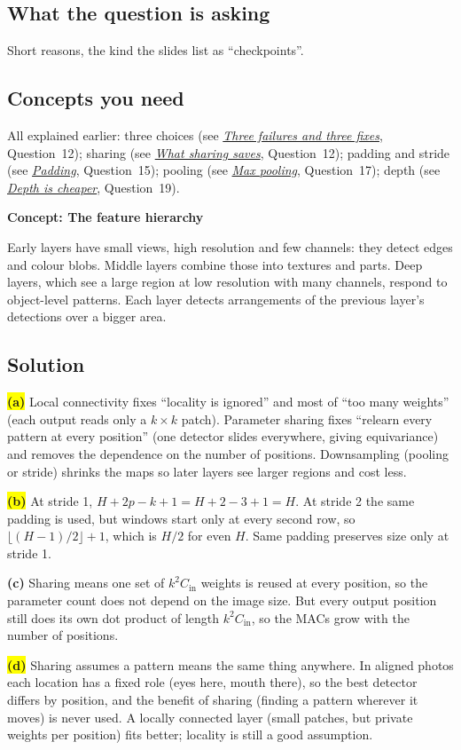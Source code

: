 \documentclass[12pt,a4paper]{article}
\newcommand{\concept}[2]{\par\medskip\phantomsection\label{#1}{\large\bfseries\color{blue!50!black} Concept: #2}\par}
\newcommand{\seeconcept}[3]{(see \hyperref[#1]{\textit{#2}}, Question~#3)}
\newcommand{\hlq}[1]{{\setlength{\fboxsep}{1.5pt}\colorbox{yellow}{#1}}}
\begin{document}
\subsection*{What the question is asking}
Short reasons, the kind the slides list as ``checkpoints''.

\subsection*{Concepts you need}
All explained earlier: three choices \seeconcept{c:threechoices}{Three failures and three fixes}{12}; sharing \seeconcept{c:sharing}{What sharing saves}{12}; padding and stride \seeconcept{c:padding}{Padding}{15}; pooling \seeconcept{c:maxpool}{Max pooling}{17}; depth \seeconcept{c:depth}{Depth is cheaper}{19}.

\concept{c:hierarchy}{The feature hierarchy}
Early layers have small views, high resolution and few channels: they detect edges and colour blobs. Middle layers combine those into textures and parts. Deep layers, which see a large region at low resolution with many channels, respond to object-level patterns. Each layer detects arrangements of the previous layer's detections over a bigger area.

\subsection*{Solution}
\hlq{\textbf{(a)}} Local connectivity fixes ``locality is ignored'' and most of ``too many weights'' (each output reads only a $k\times k$ patch). Parameter sharing fixes ``relearn every pattern at every position'' (one detector slides everywhere, giving equivariance) and removes the dependence on the number of positions. Downsampling (pooling or stride) shrinks the maps so later layers see larger regions and cost less.

\hlq{\textbf{(b)}} At stride 1, $H+2p-k+1=H+2-3+1=H$. At stride 2 the same padding is used, but windows start only at every second row, so $\lfloor(H-1)/2\rfloor+1$, which is $H/2$ for even $H$. Same padding preserves size only at stride 1.

\textbf{(c)} Sharing means one set of $k^2C_{\text{in}}$ weights is reused at every position, so the parameter count does not depend on the image size. But every output position still does its own dot product of length $k^2C_{\text{in}}$, so the MACs grow with the number of positions.

\hlq{\textbf{(d)}} Sharing assumes a pattern means the same thing anywhere. In aligned photos each location has a fixed role (eyes here, mouth there), so the best detector differs by position, and the benefit of sharing (finding a pattern wherever it moves) is never used. A locally connected layer (small patches, but private weights per position) fits better; locality is still a good assumption.
\end{document}
